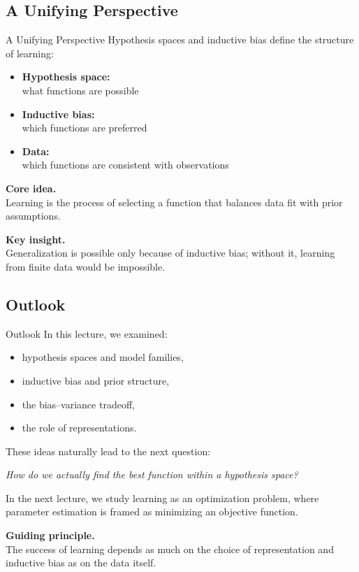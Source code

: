 \documentclass[aspectratio=169,11pt]{beamer}
\begin{document}
\subsection{A Unifying Perspective}
\begin{frame}[t,allowframebreaks]{A Unifying Perspective}
\small
Hypothesis spaces and inductive bias define the structure of learning:

\begin{itemize}
    \item \textbf{Hypothesis space:}\\ what functions are possible
    \item \textbf{Inductive bias:}\\ which functions are preferred
    \item \textbf{Data:}\\ which functions are consistent with observations
\end{itemize}

\textbf{Core idea.}\\ Learning is the process of selecting a function that balances data fit with prior assumptions.

\textbf{Key insight.}\\ Generalization is possible only because of inductive bias; without it, learning from finite data would be impossible.
\end{frame}

\subsection{Outlook}
\begin{frame}[t,allowframebreaks]{Outlook}
\small
In this lecture, we examined:

\begin{itemize}
    \item hypothesis spaces and model families,
    \item inductive bias and prior structure,
    \item the bias--variance tradeoff,
    \item the role of representations.
\end{itemize}

These ideas naturally lead to the next question:

\textit{How do we actually find the best function within a hypothesis space?}

In the next lecture, we study learning as an optimization problem, where parameter estimation is framed as minimizing an objective function.

\textbf{Guiding principle.}\\ The success of learning depends as much on the choice of representation and inductive bias as on the data itself.
\end{frame}
\end{document}
